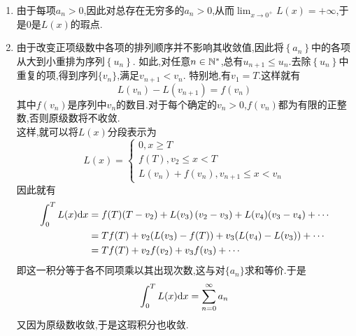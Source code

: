 \documentclass{ctexart}
\begin{document}
\begin{solution}
    \begin{enumerate}[label=\tbf{(\arabic*)},topsep=0pt,parsep=0pt,itemsep=0pt,partopsep=0pt]
        \item 由于每项$a_n>0$,因此对总存在无穷多的$a_n>0$,从而$\displaystyle\lim_{x\to0^+}L(x)=+\infty$,于是$0$是$L(x)$的瑕点.
        \item 由于改变正项级数中各项的排列顺序并不影响其收敛值,因此将$\left\{a_n\right\}$中的各项从大到小重排为序列$\left\{u_n\right\}$.%
            如此,对任意$n\in\mathbb{N}^*$,总有$u_{n+1}\leqslant u_n$.去除$\left\{u_n\right\}$中重复的项,得到序列$\{v_n\}$,满足$v_{n+1}<v_n$.%
            特别地,有$v_1=T$.这样就有
            \[L(v_n)-L(v_{n+1})=f\left(v_{n}\right)\]
            其中$f(v_n)$是序列中$v_n$的数目.对于每个确定的$v_n>0$,$f\left(v_n\right)$都为有限的正整数,否则原级数将不收敛.\\
            这样,就可以将$L(x)$分段表示为
            \[L(x)=\left\{\begin{array}{l}
                0,x\geqslant T\\
                f(T),v_2\leqslant x<T\\
                L(v_{n})+f(v_n),v_{n+1}\leqslant x<v_n
            \end{array}\right.\]
            因此就有
            \[\begin{aligned}
                \int_0^{T}L(x)\mathrm{d} x
                &= f(T)(T-v_2)+L(v_3)\left(v_2-v_3\right)+L(v_4)(v_3-v_4)+\cdots \\
                &= Tf(T)+v_2(L(v_3)-f(T))+v_3(L(v_4)-L(v_3))+\cdots \\
                &= Tf(T)+v_2f(v_2)+v_3f(v_3)+\cdots
            \end{aligned}\]
            即这一积分等于各不同项乘以其出现次数,这与对$\{a_n\}$求和等价.于是
            \[\int_0^{T}L(x)\mathrm{d} x=\sum_{n=0}^{\infty}a_n\]
            又因为原级数收敛,于是这瑕积分也收敛.
    \end{enumerate}
\end{solution}
\end{document}
